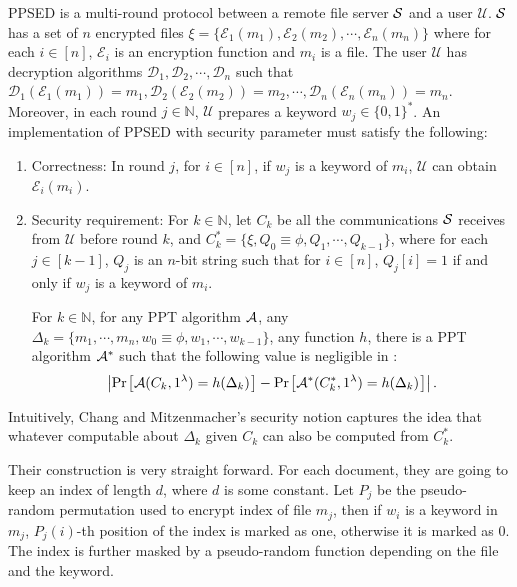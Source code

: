 \begin{definition}
	\normalfont
	PPSED is a multi-round protocol between a remote file server $\mathcal{S}$ and a user $\mathcal{U}$. $\mathcal{S}$ has a set of $n$ encrypted files $\xi = \{\mathcal{E}_1(m_1), \mathcal{E}_2(m_2), \cdots, \mathcal{E}_n(m_n) \}$ where for each $i \in [n]$, $\mathcal{E}_i$ is an encryption function and $m_i$ is a file. The user $\mathcal{U}$ has decryption algorithms $\mathcal{D}_1, \mathcal{D}_2, \cdots, \mathcal{D}_n$ such that $\mathcal{D}_1(\mathcal{E}_1(m_1)) = m_1, \mathcal{D}_2(\mathcal{E}_2(m_2)) = m_2, \cdots, \mathcal{D}_n(\mathcal{E}_n(m_n)) = m_n$. Moreover, in each round $j \in \mathbb{N}$, $\mathcal{U}$ prepares a keyword $w_j \in \{0,1\}^*$. An implementation of PPSED with security parameter \secparam must satisfy the following:
	
	\begin{enumerate}
		\item Correctness: In round $j$, for $i \in [n]$, if $w_j$ is a keyword of $m_i$, $\mathcal{U}$ can obtain $\mathcal{E}_i(m_i)$.
		
		\item Security requirement: For $k \in \mathbb{N}$, let $C_k$ be all the communications $\mathcal{S}$ receives from $\mathcal{U}$ before round $k$, and $C_k^* = \{\xi, Q_0 \equiv \phi, Q_1, \cdots, Q_{k-1} \}$, where for each $j \in [k-1]$, $Q_j$ is an $n$-bit string such that for $i \in [n]$, $Q_j[i] = 1$ if and only if $w_j$ is a keyword of $m_i$.
		
		
		For $k \in \mathbb{N}$, for any PPT algorithm $\mathcal{A}$, any $\Delta_k = \{m_1, \cdots, m_n, w_0 \equiv \phi, w_1, \cdots, w_{k-1} \}$, any function $h$, there is a PPT algorithm $\mathcal{A}^*$ such that the following value is negligible in \secparam:
		\begin{equation*}
			\left| \prob{\adversary(C_k, \secparam) = h(\Delta_k)} - \prob{\adversary^*(C_k^*, \secparam) = h(\Delta_k)} \right|.
		\end{equation*}
	\end{enumerate} 
\end{definition}

Intuitively, Chang and Mitzenmacher's security notion captures the idea that whatever computable about $\Delta_k$ given $C_k$ can also be computed from $C_k^*$.

Their construction is very straight forward. For each document, they are going to keep an index of length $d$, where $d$ is some constant. Let $P_j$ be the pseudo-random permutation used to encrypt index of file $m_j$, then if $w_i$ is a keyword in $m_j$, $P_j(i)$-th position of the index is marked as one, otherwise it is marked as 0. The index is further masked by a pseudo-random function depending on the file and the keyword.




